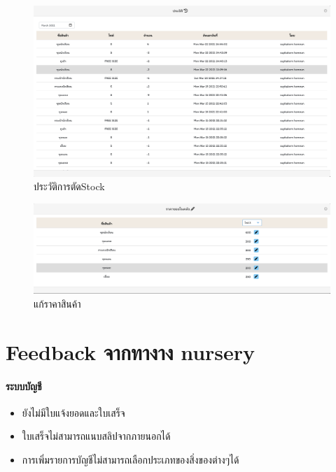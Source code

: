 \begin{figure}
    \begin{center}
      \includegraphics[width=\linewidth]{images/historyStock.png}
    \end{center}
    \caption[Poem]{ประวัติการตัดStock}
    \label{fig:historystock}
\end{figure}

\begin{figure}
    \begin{center}
      \includegraphics[width=\linewidth]{images/editPrice.png}
    \end{center}
    \caption[Poem]{แก้ราคาสินค้า}
    \label{fig:editprice}
\end{figure}


\section{Feedback จากทางาง nursery}
\paragraph{ระบบบัญชี}
\begin{itemize}
    \item ยังไม่มีใบแจ้งยอดและใบเสร็จ
    \item ใบเสร็จไม่สามารถแนบสลิปจากภายนอกได้
    \item การเพิ่มรายการบัญชีไม่สามารถเลือกประเภทของสิ่งของต่างๆได้ 
\end{itemize}
